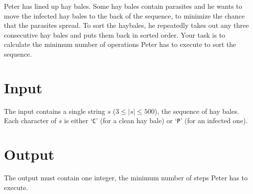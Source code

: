

Peter has lined up hay bales. Some hay bales contain parasites and he wants to move the infected hay bales to the back of the sequence, to minimize the chance that the parasites spread. To sort the haybales, he repeatedly takes out any three consecutive hay bales and puts them back in sorted order. Your task is to calculate the minimum number of operations Peter has to execute to sort the sequence.

\section*{Input}
The input contains a single string $s$ ($3 \leq |s| \leq 500$), the sequence of hay bales.
Each character of $s$ is either `\texttt{C}' (for a clean hay bale) or `\texttt{P}' (for an infected one).

\section*{Output}
The output must contain one integer, the minimum number of steps Peter has to execute.
